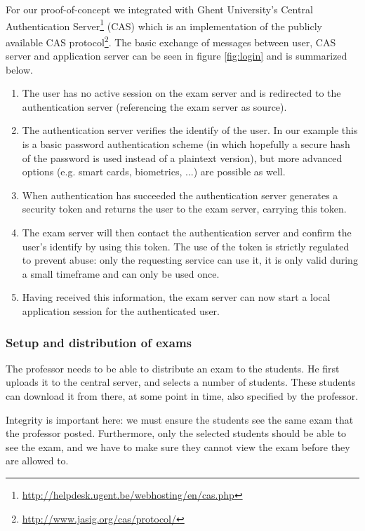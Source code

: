 \documentclass{article}
\begin{document}
For our proof-of-concept we integrated with Ghent University's Central
Authentication Server\footnote{\url{http://helpdesk.ugent.be/webhosting/en/cas.php}}
(CAS) which is an implementation of the publicly available CAS
protocol\footnote{\url{http://www.jasig.org/cas/protocol/}}. The basic
exchange of messages between user, CAS server and application server can be seen
in figure \ref{fig:login} and is summarized below.

\begin{enumerate}
\item The user has no active session on the exam server and is redirected
  to the authentication server (referencing the exam server as source).
\item The authentication server verifies the identify of the user. In our
  example this is a basic password authentication scheme (in which hopefully a
  secure hash of the password is used instead of a plaintext version), but more
  advanced options (e.g. smart cards, biometrics, ...) are possible as well.
\item When authentication has succeeded the authentication server generates
  a security token and returns the user to the exam server, carrying this token.
\item The exam server will then contact the authentication server and confirm
  the user's identify by using this token. The use of the token is strictly
  regulated to prevent abuse: only the requesting service can use it, it is only
  valid during a small timeframe and can only be used once.
\item Having received this information, the exam server can now start a local
  application session for the authenticated user.
\end{enumerate}

\subsubsection{Setup and distribution of exams}

The professor needs to be able to distribute an exam to the students. He first
uploads it to the central server, and selects a number of students. These
students can download it from there, at some point in time, also specified by
the professor.

Integrity is important here: we must ensure the students see the same exam that
the professor posted. Furthermore, only the selected students should be able to
see the exam, and we have to make sure they cannot view the exam before they are
allowed to.
\end{document}
